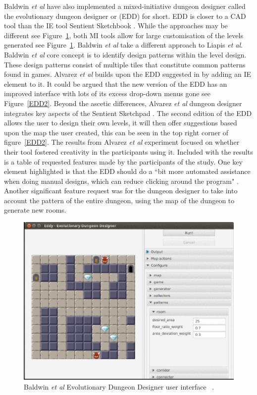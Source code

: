 \documentclass[journal]{IEEEtran}
\begin{document}
Baldwin \textit{et al} \cite{baldwin2017mixed} have also implemented a mixed-initiative dungeon designer called the evolutionary dungeon designer or (EDD) for short. EDD is closer to a CAD tool than the IE tool Sentient Sketchbook \cite{liapis2013sentient}. While the approaches may be different see Figure~\ref{EDD}, both MI tools allow for large customisation of the levels generated see Figure~\ref{EDD}. Baldwin \textit{et al} \cite{baldwin2017mixed} take a different approach to Liapis \textit{et al}\cite{liapis2013sentient}. Baldwin \textit{et al} \cite{baldwin2017mixed} core concept is to identify design patterns within the level design. These design patterns consist of multiple tiles that constitute common patterns found in games. Alvarez \textit{et al}\cite{alvarez2018fostering} builds upon the EDD suggested in \cite{baldwin2017mixed} by adding an IE element to it. It could be argued that the new version of the EDD has an improved interface with lots of its excess drop-down menus gone see Figure~\ref{EDD2}. Beyond the ascetic differences, Alvarez \textit{et al}\cite{alvarez2018fostering} dungeon designer integrates key aspects of the Sentient Sketchpad \cite{liapis2013sentient}. The second edition of the EDD allows the user to design their own levels, it will then offer suggestions based upon the map the user created, this can be seen in the top right corner of figure~\ref{EDD2}. The results from Alvarez \textit{et al}\cite{alvarez2018fostering} experiment focused on whether their tool fostered creativity in the participants using it. Included with the results is a table of requested features made by the participants of the study. One key element highlighted is that the EDD should do a ``bit more automated assistance when doing manual designs, which can reduce clicking around the program" \cite[Table 2]{alvarez2018fostering}. Another significant feature request was for the dungeon designer to take into account the pattern of the entire dungeon, using the map of the dungeon to generate new rooms.

\begin{figure}[h]
	\includegraphics[width=1.0\linewidth]{EDD.PNG}
	\caption{ Baldwin \textit{et al} Evolutionary Dungeon Designer user interface ~\cite{baldwin2017mixed}.}
	\label{EDD}
\end{figure} 
\end{document}
